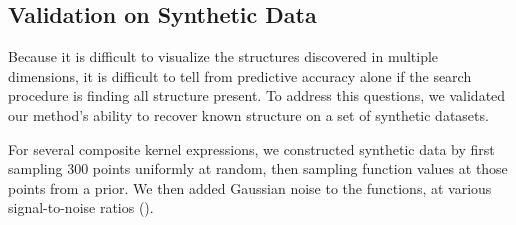 \subsection{Validation on Synthetic Data}
\label{sec:synthetic}

Because it is difficult to visualize the structures discovered in multiple dimensions, it is difficult to tell from predictive accuracy alone if the search procedure is finding all structure present.
To address this questions, we validated our method's ability to recover known structure on a set of synthetic datasets.

For several composite kernel expressions, we constructed synthetic data by first sampling 300 points uniformly at random, then sampling function values at those points from a \gp{} prior.
We then added \iid Gaussian noise to the functions, at various signal-to-noise ratios (\SNR{}).

